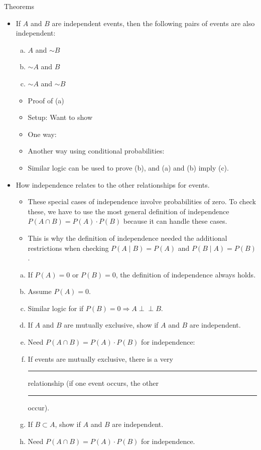 \documentclass{article}
\newcommand{\blankul}[1]{\rule[-1.5mm]{#1}{0.15mm}}	%
\newcommand{\comp}{{\sim}}						%
\newcommand{\ind}{\perp \!\!\! \perp}		%
\begin{document}
Theorems
\bigskip
\begin{itemize}
    \item If $A$ and $B$ are independent events, then the following pairs of events are also independent:
    \begin{enumerate}[(a)]
        \item $A$ and $\comp B$
        \item $\comp A$ and $B$
        \item $\comp A$ and $\comp B$
    \end{enumerate}\bigskip
    \begin{itemize}
        \item Proof of (a)
        \item[] Setup: Want to show 
        \item[] One way:\vspace{170pt}
        \item[] Another way using conditional probabilities: \vfill
        \item Similar logic can be used to prove (b), and (a) and (b) imply (c).
    \end{itemize}\newpage
    \item How independence relates to the other relationships for events.
    \begin{itemize}
        \item These special cases of independence involve probabilities of zero. To check these, we have to use the most general definition of independence \\ $P(A \cap B) = P(A) \cdot P(B)$ because it can handle these cases.\vspace{40pt}
        \item[] This is why the definition of independence needed the additional restrictions when checking $P(A \mid B) = P(A)$ and $P(B \mid A) = P(B)$. 
    \end{itemize}\bigskip
    \begin{enumerate}[(a)]
        \item If $P(A) = 0$ or $P(B) = 0$, the definition of independence always holds.
        \item[] Assume $P(A) = 0$.\vspace{120pt}
        \item[] Similar logic for if $P(B) = 0 \Longrightarrow A \ind B$.\\
        \item If $A$ and $B$ are mutually exclusive, show if $A$ and $B$ are independent.
        \item[] Need $P(A \cap B) = P(A) \cdot P(B)$ for independence:\vspace{100pt}
        \item[] If events are mutually exclusive, there is a very \blankul{3cm} relationship (if one event occurs, the other \blankul{2cm} occur).\bigskip
        \item If $B \subset A$, show if $A$ and $B$ are independent.
        \item[] Need $P(A \cap B) = P(A) \cdot P(B)$ for independence.\vspace{140pt}
    \end{enumerate}
\end{itemize}\bigskip
\end{document}
